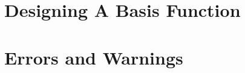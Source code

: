 \documentclass[letterpaper,10pt,english]{sphinxmanual}
\begin{document}
\section{Designing A Basis Function}
\label{\detokenize{source/maxsmooth:designing-a-basis-function}}

\section{Errors and Warnings}
\label{\detokenize{source/maxsmooth:errors-and-warnings}}

\renewcommand{\indexname}{Python Module Index}
\begin{sphinxtheindex}
\let\bigletter\sphinxstyleindexlettergroup
\bigletter{m}
\item\relax{}
\item\relax{}
\end{sphinxtheindex}

\renewcommand{\indexname}{Index}
\printindex
\end{document}
